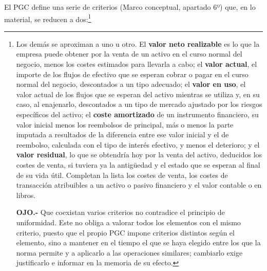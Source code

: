 \documentclass[10pt,a4paper]{article}
\begin{document}
El PGC define una serie de criterios (Marco conceptual, apartado $6$º) que, en lo material, se reducen a dos:\footnote{%
    Los demás se aproximan a uno u otro. El \textbf{valor neto realizable} es lo que la empresa puede obtener por la venta de un activo en el curso normal del negocio, menos los costes estimados para llevarla a cabo; el \textbf{valor actual}, el importe de los flujos de efectivo que se esperan cobrar o pagar en el curso normal del negocio, descontados a un tipo adecuado; el \textbf{valor en uso}, el valor actual de los flujos que se esperan del activo mientras se utiliza y, en su caso, al enajenarlo, descontados a un tipo de mercado ajustado por los riesgos específicos del activo; el \textbf{coste amortizado} de un instrumento financiero, su valor inicial menos los reembolsos de principal, más o menos la parte imputada a resultados de la diferencia entre ese valor inicial y el de reembolso, calculada con el tipo de interés efectivo, y menos el deterioro; y el \textbf{valor residual}, lo que se obtendría hoy por la venta del activo, deducidos los costes de venta, si tuviera ya la antigüedad y el estado que se esperan al final de su vida útil. Completan la lista los costes de venta, los costes de transacción atribuibles a un activo o pasivo financiero y el valor contable o en libros.

    \textbf{OJO.-} Que coexistan varios criterios no contradice el principio de uniformidad. Este no obliga a valorar todos los elementos con el mismo criterio, puesto que el propio PGC impone criterios distintos según el elemento, sino a mantener en el tiempo el que se haya elegido entre los que la norma permite y a aplicarlo a las operaciones similares; cambiarlo exige justificarlo e informar en la memoria de su efecto.
}
\end{document}
